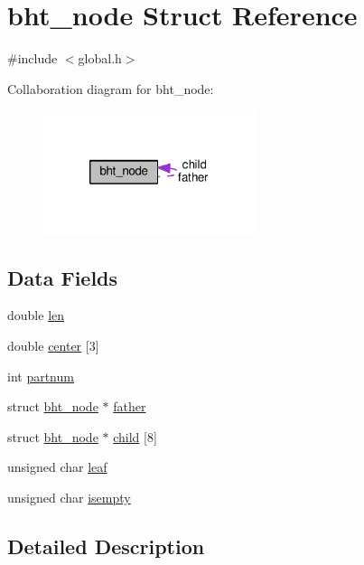 \hypertarget{structbht__node}{\section{bht\-\_\-node Struct Reference}
\label{structbht__node}
}


{\ttfamily \#include $<$global.\-h$>$}



Collaboration diagram for bht\-\_\-node\-:\nopagebreak
\begin{figure}[H]
\begin{center}
\leavevmode
\includegraphics[width=178pt]{structbht__node__coll__graph}
\end{center}
\end{figure}
\subsection*{Data Fields}
\begin{DoxyCompactItemize}
\item 
double \hyperlink{structbht__node_ad4bd51cdbe6ba41894905207ed94974f}{len}
\item 
double \hyperlink{structbht__node_a9da2c4f10aed3a86628aad3dd87c9d6a}{center} \mbox{[}3\mbox{]}
\item 
int \hyperlink{structbht__node_a0c60ab00baa47c069768352b2f2b6d3d}{partnum}
\item 
struct \hyperlink{structbht__node}{bht\-\_\-node} $\ast$ \hyperlink{structbht__node_ad327b7e4aaac3a9687feb283d05fabbe}{father}
\item 
struct \hyperlink{structbht__node}{bht\-\_\-node} $\ast$ \hyperlink{structbht__node_a79d661ac20d812ad17b1d7455ad9e031}{child} \mbox{[}8\mbox{]}
\item 
unsigned char \hyperlink{structbht__node_afdde1540721b0d5dbc4b234677b4ad8d}{leaf}
\item 
unsigned char \hyperlink{structbht__node_a3aa7881ee7de66da41c4eeacb9280836}{isempty}
\end{DoxyCompactItemize}


\subsection{Detailed Description}


